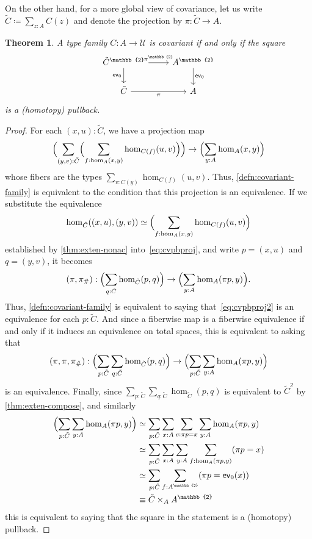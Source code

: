 \documentclass[12pt]{amsart}
\theoremstyle{plain}
\newtheorem{thm}{Theorem}[section]
\theoremstyle{definition}
\theoremstyle{remark}
\numberwithin{equation}{section}
\newcommand{\extfn}[1]{{#1}_\#}
\newcommand{\jdeq}{\equiv}
\newcommand{\defeq}{\coloneqq}
\newcommand{\univtype}{\mathcal{U}}
\newcommand{\two}{\mathbb{2}}
\newcommand{\Parens}[1]{\Bigl(#1\Bigr)}
\begin{document}
On the other hand, for a more global view of covariance, let us write $\tilde C \defeq {\sum_{z:A} C(z)}$ and denote the projection by $\pi : \tilde C \to A$.

\begin{thm}\label{thm:covariance-as-pullback} A type family  $C : A \to \univtype$ is covariant if and only if the square
\[ 
\begin{tikzcd}
 \tilde C^\two \arrow[r, "{\pi^\two}"] \arrow[d, "{\mathsf{ev}_0}"'] &
  A^\two \arrow[d, "{\mathsf{ev}_0}"] \\
  \tilde C \arrow[r, "\pi"'] &
  A 
  \end{tikzcd}\]
is a (homotopy) pullback.
\end{thm}
\begin{proof}
For each $(x,u) : \tilde C$, we have a projection map
\begin{equation}
  \Parens{\sum_{(y,v):\tilde C} \Parens{\sum_{f:\hom_A(x,y)} \hom_{C(f)}(u,v)}} \to \Parens{\sum_{y:A} \hom_A(x, y)}\label{eq:cvpbproj}
\end{equation}
whose fibers are the types $\sum_{v:C(y)} \hom_{C(f)}(u,v)$.
Thus, \cref{defn:covariant-family} is equivalent to the condition that this projection is an equivalence.
If we substitute the equivalence  \[\hom_{\tilde C}((x,u),(y,v)) \simeq \Parens{\sum_{f:\hom_A(x,y)} \hom_{C(f)}(u,v)}\]
established by \cref{thm:exten-nonac} into~\eqref{eq:cvpbproj}, and write $p=(x,u)$ and $q=(y,v)$, it becomes
\begin{equation}
  (\pi,\extfn\pi) : \Parens{\sum_{q:\tilde C} \hom_{\tilde C}(p,q)} \to \Parens{\sum_{y:A} \hom_A(\pi p, y)}.\label{eq:cvpbproj2}
\end{equation}
Thus, \cref{defn:covariant-family} is equivalent to saying that~\eqref{eq:cvpbproj2} is an equivalence for each $p:\tilde{C}$.
And since a fiberwise map is a fiberwise equivalence if and only if it induces an equivalence on total spaces, this is equivalent to asking that
\[ (\pi,\pi,\extfn\pi) : \Parens{\sum_{p : \tilde C} \sum_{q:\tilde C} \hom_{\tilde C}(p,q)} \to \Parens{\sum_{p : \tilde C}\sum_{y : A} \hom_A(\pi p, y)}\]
is an equivalence.
Finally, since $\sum_{p : \tilde C} \sum_{q:\tilde C} \hom_{\tilde C}(p,q)$ is equivalent to $\tilde C^\two$ by \cref{thm:exten-compose}, and similarly
\begin{align*}
  \Parens{\sum_{p : \tilde C}\sum_{y : A} \hom_A(\pi p, y)}
  &\simeq \sum_{p : \tilde C}\sum_{x:A} \sum_{e:\pi p=x}\sum_{y : A} \hom_A(\pi p, y)\\
  &\simeq \sum_{p : \tilde C}\sum_{x:A}\sum_{y : A}\sum_{f:\hom_A(\pi p, y)} (\pi p=x)\\
  &\simeq \sum_{p : \tilde C} \sum_{f:A^\two} (\pi p=\mathsf{ev}_0(x))\\
  &\jdeq \tilde C \times_{A} A^\two
\end{align*}
this is equivalent to saying that the square in the statement is a (homotopy) pullback.
\end{proof}
\end{document}
